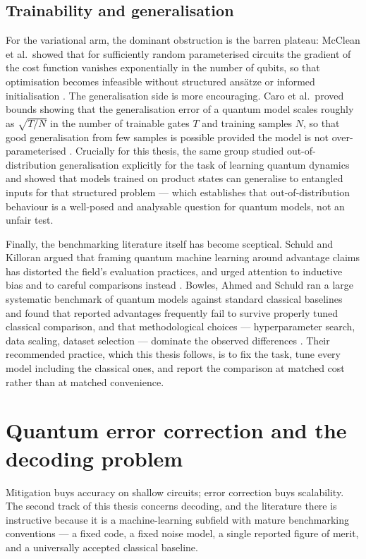 \documentclass[Thesis.tex]{subfiles}
\begin{document}
\subsection{Trainability and generalisation}

For the variational arm, the dominant obstruction is the barren plateau:
McClean et al.\ showed that for sufficiently random parameterised circuits the
gradient of the cost function vanishes exponentially in the number of qubits,
so that optimisation becomes infeasible without structured ans\"atze or
informed initialisation \cite{mcclean2018barren}. The generalisation side is
more encouraging. Caro et al.\ proved bounds showing that the generalisation
error of a quantum model scales roughly as $\sqrt{T/N}$ in the number of
trainable gates $T$ and training samples $N$, so that good generalisation from
few samples is possible provided the model is not over-parameterised
\cite{caro2022generalization}. Crucially for this thesis, the same group
studied out-of-distribution generalisation explicitly for the task of learning
quantum dynamics and showed that models trained on product states can
generalise to entangled inputs for that structured problem
\cite{caro2023ood} --- which establishes that out-of-distribution behaviour is
a well-posed and analysable question for quantum models, not an unfair test.

Finally, the benchmarking literature itself has become sceptical. Schuld and
Killoran argued that framing quantum machine learning around advantage claims
has distorted the field's evaluation practices, and urged attention to
inductive bias and to careful comparisons instead \cite{schuld2022isquantum}.
Bowles, Ahmed and Schuld ran a large systematic benchmark of quantum models
against standard classical baselines and found that reported advantages
frequently fail to survive properly tuned classical comparison, and that
methodological choices --- hyperparameter search, data scaling, dataset
selection --- dominate the observed differences \cite{bowles2024better}. Their
recommended practice, which this thesis follows, is to fix the task, tune
every model including the classical ones, and report the comparison at matched
cost rather than at matched convenience.

\section{Quantum error correction and the decoding problem}\label{sec2:qec}

Mitigation buys accuracy on shallow circuits; error correction buys
scalability. The second track of this thesis concerns decoding, and the
literature there is instructive because it is a machine-learning subfield with
mature benchmarking conventions --- a fixed code, a fixed noise model, a single
reported figure of merit, and a universally accepted classical baseline.
\end{document}
